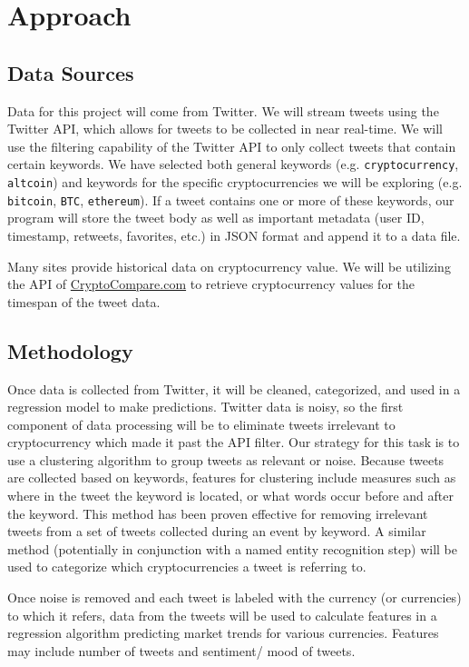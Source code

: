 \documentclass[sigconf]{acmart}
\newcommand{\code}{\texttt}
\begin{document}
\section{Approach}

\subsection{Data Sources}
Data for this project will come from Twitter. We will stream tweets using the Twitter API, which allows for tweets to be collected in near real-time. We will use the filtering capability of the Twitter API to only collect tweets that contain certain keywords. We have selected both general keywords (e.g. \code{cryptocurrency}, \code{altcoin}) and keywords for the specific cryptocurrencies we will be exploring (e.g. \code{bitcoin}, \code{BTC}, \code{ethereum}). If a tweet contains one or more of these keywords, our program will store the tweet body as well as important metadata (user ID, timestamp, retweets, favorites, etc.) in JSON format and append it to a data file.

Many sites provide historical data on cryptocurrency value. We will be utilizing the API of \href{https://www.cryptocompare.com}{CryptoCompare.com} to retrieve cryptocurrency values for the timespan of the tweet data.

\subsection{Methodology}
Once data is collected from Twitter, it will be cleaned, categorized, and used in a regression model to make predictions. Twitter data is noisy, so the first component of data processing will be to eliminate tweets irrelevant to cryptocurrency which made it past the API filter. Our strategy for this task is to use a clustering algorithm to group tweets as relevant or noise. Because tweets are collected based on keywords, features for clustering include measures such as where in the tweet the keyword is located, or what words occur before and after the keyword. This method has been proven effective for removing irrelevant tweets from a set of tweets collected during an event by keyword\cite{sakai}. A similar method (potentially in conjunction with a named entity recognition step) will be used to categorize which cryptocurrencies a tweet is referring to.

Once noise is removed and each tweet is labeled with the currency (or currencies) to which it refers, data from the tweets will be used to calculate features in a regression algorithm predicting market trends for various currencies. Features may include number of tweets and sentiment/ mood of tweets.
\end{document}
